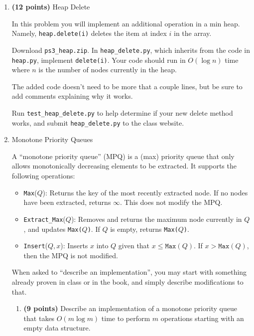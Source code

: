 \documentclass[12pt,twoside]{article}
\begin{document}
\begin{enumerate}

\item {\bf (12 points)} Heap Delete

In this problem you will implement an additional operation in a min
heap.  Namely, \texttt{heap.delete(i)} deletes the item at index $i$
in the array.

Download \texttt{ps3\_heap.zip}. In \texttt{heap\_delete.py},
which inherits from the code in \texttt{heap.py}, implement
\texttt{delete(i)}. Your code should run in $O(\log n)$ time where $n$
is the number of nodes currently in the heap.

The added code doesn't need to be more that a couple lines, but be
sure to add comments explaining why it works.

Run \texttt{test\_heap\_delete.py} to help determine if your new
delete method works, and submit \texttt{heap\_delete.py} to the class
website.

\item Monotone Priority Queues

A ``monotone priority queue'' (MPQ) is a (max) priority queue that
only allows monotonically decreasing elements to be extracted. It
supports the following operations:

\begin{itemize}
\item \texttt{Max}($Q$): Returns the key of the most recently
  extracted node. If no nodes have been extracted, returns
  $\infty$. This does not modify the MPQ.

\item \texttt{Extract\_Max}($Q$): Removes and returns the maximum node
  currently in $Q$, and updates \texttt{Max($Q$)}. If $Q$ is empty,
  returns \texttt{Max($Q$)}.

\item \texttt{Insert}($Q, x$): Inserts $x$ into $Q$ given that $x \leq
\texttt{Max}(Q)$. If $x> \texttt{Max}(Q)$, then the MPQ is not modified.
\end{itemize}


When asked to ``describe an implementation'', you may start with
something already proven in class or in the book, and simply describe
modifications to that.

\begin{enumerate}

\item {\bf (9 points)} Describe an implementation of a monotone priority
queue that takes $O(m \log m)$ time to perform $m$ operations starting
with an empty data structure.


\end{enumerate}
\end{enumerate}
\end{document}
